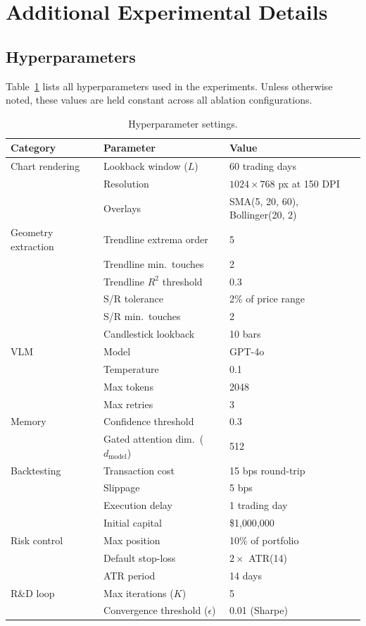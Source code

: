 \section{Additional Experimental Details}
\label{app:details}

\subsection{Hyperparameters}

Table~\ref{tab:hyperparams} lists all hyperparameters used in the experiments. Unless otherwise noted, these values are held constant across all ablation configurations.

\begin{table}[h]
\centering
\caption{Hyperparameter settings.}
\label{tab:hyperparams}
\begin{tabular}{lll}
\toprule
Category & Parameter & Value \\
\midrule
Chart rendering & Lookback window ($L$) & 60 trading days \\
                & Resolution & $1024 \times 768$ px at 150 DPI \\
                & Overlays & SMA(5, 20, 60), Bollinger(20, 2) \\
\midrule
Geometry extraction & Trendline extrema order & 5 \\
                    & Trendline min.\ touches & 2 \\
                    & Trendline $R^2$ threshold & 0.3 \\
                    & S/R tolerance & 2\% of price range \\
                    & S/R min.\ touches & 2 \\
                    & Candlestick lookback & 10 bars \\
\midrule
VLM & Model & GPT-4o \\
    & Temperature & 0.1 \\
    & Max tokens & 2048 \\
    & Max retries & 3 \\
\midrule
Memory & Confidence threshold & 0.3 \\
       & Gated attention dim.\ ($d_{\text{model}}$) & 512 \\
\midrule
Backtesting & Transaction cost & 15 bps round-trip \\
            & Slippage & 5 bps \\
            & Execution delay & 1 trading day \\
            & Initial capital & \$1{,}000{,}000 \\
\midrule
Risk control & Max position & 10\% of portfolio \\
             & Default stop-loss & $2 \times$ ATR(14) \\
             & ATR period & 14 days \\
\midrule
R\&D loop & Max iterations ($K$) & 5 \\
           & Convergence threshold ($\epsilon$) & 0.01 (Sharpe) \\
\bottomrule
\end{tabular}
\end{table}

